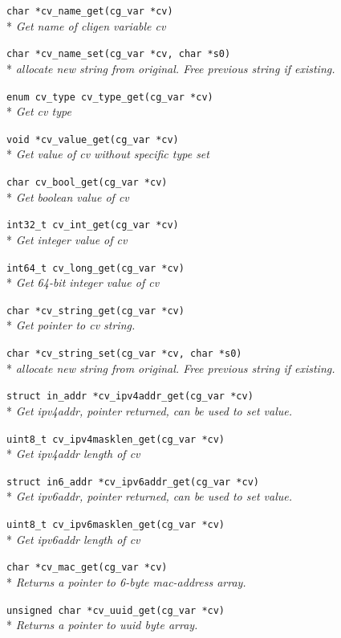 \documentclass[a4paper, 10pt] {article}
\begin{document}
{{\tt char *cv\_name\_get(cg\_var *cv)}\\*
\emph{ Get name of cligen variable cv}

{\tt char *cv\_name\_set(cg\_var *cv, char *s0)}\\*
\emph{ allocate new string from original. Free previous string if existing.}

{\tt enum cv\_type cv\_type\_get(cg\_var *cv)}\\*
\emph{ Get cv type}

{\tt void *cv\_value\_get(cg\_var *cv)}\\*
\emph{ Get value of cv without specific type set}

{\tt char cv\_bool\_get(cg\_var *cv)}\\*
\emph{ Get boolean value of cv}

{\tt int32\_t cv\_int\_get(cg\_var *cv)}\\*
\emph{ Get integer value of cv}

{\tt int64\_t cv\_long\_get(cg\_var *cv)}\\*
\emph{ Get 64-bit integer value of cv}

{\tt char *cv\_string\_get(cg\_var *cv)}\\*
\emph{ Get pointer to cv string. }

{\tt char *cv\_string\_set(cg\_var *cv, char *s0)}\\*
\emph{ allocate new string from original. Free previous string if existing.}

{\tt struct in\_addr *cv\_ipv4addr\_get(cg\_var *cv)}\\*
\emph{ Get ipv4addr, pointer returned, can be used to set value.}

{\tt uint8\_t cv\_ipv4masklen\_get(cg\_var *cv)}\\*
\emph{ Get ipv4addr length of cv}

{\tt struct in6\_addr *cv\_ipv6addr\_get(cg\_var *cv)}\\*
\emph{ Get ipv6addr, pointer returned, can be used to set value.}

{\tt uint8\_t cv\_ipv6masklen\_get(cg\_var *cv)}\\*
\emph{ Get ipv6addr length of cv}

{\tt char *cv\_mac\_get(cg\_var *cv)}\\*
\emph{  Returns a pointer to 6-byte mac-address array. }

{\tt unsigned char *cv\_uuid\_get(cg\_var *cv)}\\*
\emph{ Returns a pointer to uuid byte array. }

}
\end{document}
